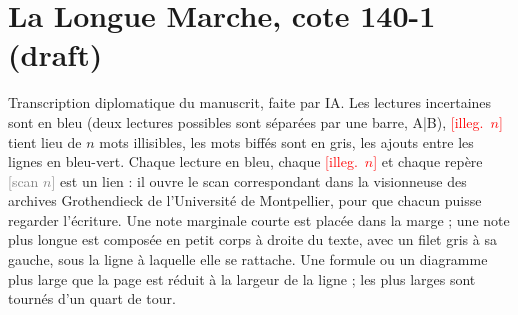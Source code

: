 \documentclass[11pt]{article}
\newcommand{\scanpage}[1]{\par\medskip\noindent{\footnotesize\textcolor{gray}{[scan #1]}}\par}
\gdef\LMcotename{}
\newcommand\LMcote[1]{\gdef\LMcotename{#1}}
\newcommand\LMmark{\ifnum\LMscanvalue>0 \LMattr=\LMscanvalue\relax\fi}
\renewcommand{\scanpage}[1]{\directlua{LMFIT.at("\luaescapestring{\LMcotename}", "\luaescapestring{\detokenize{#1}}")}%
  \par\medskip\noindent{\footnotesize\LMmark\textcolor{gray}{[scan #1]}}\par}
\begin{document}
\LMcote{140-1}
\section*{La Longue Marche, cote 140-1 (draft)}

{\small\noindent Transcription diplomatique du manuscrit, faite par IA. Les lectures incertaines sont en
{\color{blue}bleu} (deux lectures possibles sont séparées par une barre, A|B), \textcolor{red}{[illeg.~$n$]} tient lieu
de $n$ mots illisibles, les mots biffés sont en {\color{gray}gris}, les ajouts entre les lignes en {\color{teal}bleu-vert}.
Chaque lecture en bleu, chaque \textcolor{red}{[illeg.~$n$]} et chaque repère
{\footnotesize\textcolor{gray}{[scan $n$]}} est un lien : il ouvre le scan correspondant dans la visionneuse des
archives Grothendieck de l'Université de Montpellier, pour que chacun puisse regarder l'écriture. Une note marginale
courte est placée dans la marge ; une note plus longue est composée en petit corps à droite du texte, avec un filet
gris à sa gauche, sous la ligne à laquelle elle se rattache. Une formule ou un diagramme plus large que la page est
réduit à la largeur de la ligne ; les plus larges sont tournés d'un quart de tour.\par}
\medskip
\scanpage{1}
\end{document}
